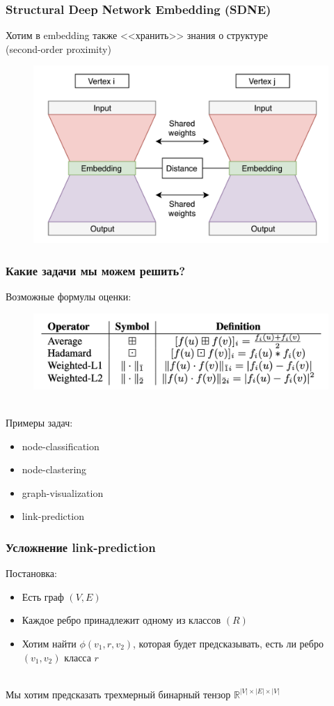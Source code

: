\documentclass{beamer}
\newcommand{\R}{\mathbb{R}}
\newcommand{\skipline}[0]{$ $\\}
\begin{document}
\begin{frame}
    \frametitle{Structural Deep Network Embedding (SDNE)}
    Хотим в embedding также <<хранить>> знания о структуре\\ (second-order proximity)
    \begin{figure}
        \includegraphics[width=0.75\columnwidth]{SDNE.png}
    \end{figure}
\end{frame}

\begin{frame}
    \frametitle{Какие задачи мы можем решить?}
    Возможные формулы оценки:
    \begin{figure}
        \includegraphics[width=0.75\columnwidth]{operators.png}
    \end{figure}
    \skipline
    Примеры задач:
    \begin{itemize}
        \item node-classification
        \item node-clastering
        \item graph-visualization
        \item link-prediction 
    \end{itemize}
\end{frame}

\begin{frame}
    \frametitle{Усложнение link-prediction}
    Постановка:
    \begin{itemize}
        \item Есть граф $\left(V, E\right)$
        \item Каждое ребро принадлежит одному из классов $(R)$
        \item Хотим найти $\phi(v_1, r, v_2)$, которая будет предсказывать, есть ли ребро $(v_1, v_2)$ класса $r$
    \end{itemize}
    \skipline
    Мы хотим предсказать трехмерный бинарный тензор $\R^{|V| \times |E| \times |V|}$
\end{frame}
\end{document}
